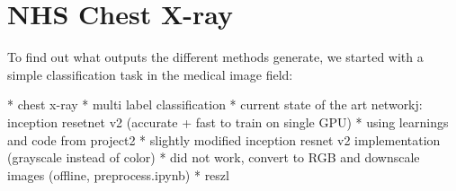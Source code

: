 \chapter{NHS Chest X-ray}
To find out what outputs the different methods generate, we started with a simple classification task in the medical image field:

* chest x-ray
* multi label classification
* current state of the art networkj: inception  resetnet v2 (accurate + fast to train on single GPU)
* using learnings and code from project2
* slightly modified inception resnet v2 implementation (grayscale instead of color)
* did not work, convert to RGB and downscale images (offline, preprocess.ipynb)
* reszl